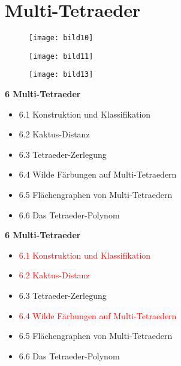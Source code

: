 \documentclass{beamer}
\begin{document}
\section{Multi-Tetraeder}
\begin{frame}
\begin{figure}[H]
\begin{center}
\texttt{[image: bild10]}
\end{center}
\end{figure}
\end{frame}
\begin{frame}
\begin{figure}[H]
\begin{center}
\texttt{[image: bild11]}
\end{center}
\end{figure}
\end{frame}
\begin{frame}
\begin{figure}[H]
\begin{center}
\texttt{[image: bild13]}
\end{center}
\end{figure}
\end{frame}
\begin{frame}
\textbf{6 Multi-Tetraeder}
\begin{itemize}
\item 6.1 Konstruktion und Klassifikation
\item 6.2 Kaktus-Distanz
\item 6.3 Tetraeder-Zerlegung
\item 6.4 Wilde Färbungen auf Multi-Tetraedern
\item 6.5 Flächengraphen von Multi-Tetraedern
\item 6.6 Das Tetraeder-Polynom
\end{itemize}
\end{frame}
\begin{frame}
\textbf{6 Multi-Tetraeder}
\begin{itemize}
\item \textcolor{red}{6.1 Konstruktion und Klassifikation}
\item \textcolor{red}{6.2 Kaktus-Distanz}
\item 6.3 Tetraeder-Zerlegung
\item \textcolor{red}{6.4 Wilde Färbungen auf Multi-Tetraedern}
\item 6.5 Flächengraphen von Multi-Tetraedern
\item 6.6 Das Tetraeder-Polynom
\end{itemize}
\end{frame}
\end{document}
